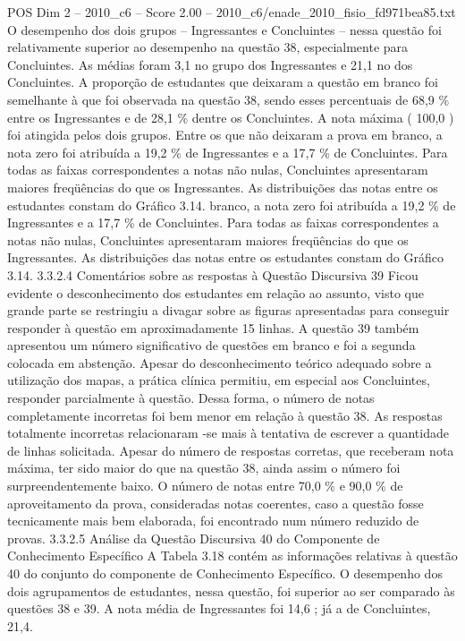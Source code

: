 \begin{textsample}{POS Dim 2 – 2010\_c6 – Score 2.00 – 2010\_c6/enade\_2010\_fisio\_fd971bea85.txt}
O desempenho dos dois grupos – Ingressantes e Concluintes – nessa questão foi relativamente superior ao desempenho na questão 38, especialmente para Concluintes.
As médias foram 3,1 no grupo dos Ingressantes e 21,1 no dos Concluintes.
A proporção de estudantes que deixaram a questão em branco foi semelhante à que foi observada na questão 38, sendo esses percentuais de 68,9 \% entre os Ingressantes e de 28,1 \% dentre os Concluintes.
A nota máxima ( 100,0 ) foi atingida pelos dois grupos.
Entre os que não deixaram a prova em branco, a nota zero foi atribuída a 19,2 \% de Ingressantes e a 17,7 \% de Concluintes.
Para todas as faixas correspondentes a notas não nulas, Concluintes apresentaram maiores freqüências do que os Ingressantes.
As distribuições das notas entre os estudantes constam do Gráfico 3.14. branco, a nota zero foi atribuída a 19,2 \% de Ingressantes e a 17,7 \% de Concluintes.
Para todas as faixas correspondentes a notas não nulas, Concluintes apresentaram maiores freqüências do que os Ingressantes.
As distribuições das notas entre os estudantes constam do Gráfico 3.14. 3.3.2.4 Comentários sobre as respostas à Questão Discursiva 39 Ficou evidente o desconhecimento dos estudantes em relação ao assunto, visto que grande parte se restringiu a divagar sobre as figuras apresentadas para conseguir responder à questão em aproximadamente 15 linhas.
A questão 39 também apresentou um número significativo de questões em branco e foi a segunda colocada em abstenção.
Apesar do desconhecimento teórico adequado sobre a utilização dos mapas, a prática clínica permitiu, em especial aos Concluintes, responder parcialmente à questão.
Dessa forma, o número de notas completamente incorretas foi bem menor em relação à questão 38.
As respostas totalmente incorretas relacionaram -se mais à tentativa de escrever a quantidade de linhas solicitada.
Apesar do número de respostas corretas, que receberam nota máxima, ter sido maior do que na questão 38, ainda assim o número foi surpreendentemente baixo.
O número de notas entre 70,0 \% e 90,0 \% de aproveitamento da prova, consideradas notas coerentes, caso a questão fosse tecnicamente mais bem elaborada, foi encontrado num número reduzido de provas. 3.3.2.5 Análise da Questão Discursiva 40 do Componente de Conhecimento Específico A Tabela 3.18 contém as informações relativas à questão 40 do conjunto do componente de Conhecimento Específico.
O desempenho dos dois agrupamentos de estudantes, nessa questão, foi superior ao ser comparado às questões 38 e 39.
A nota média de Ingressantes foi 14,6 ; já a de Concluintes, 21,4.

\end{textsample}
